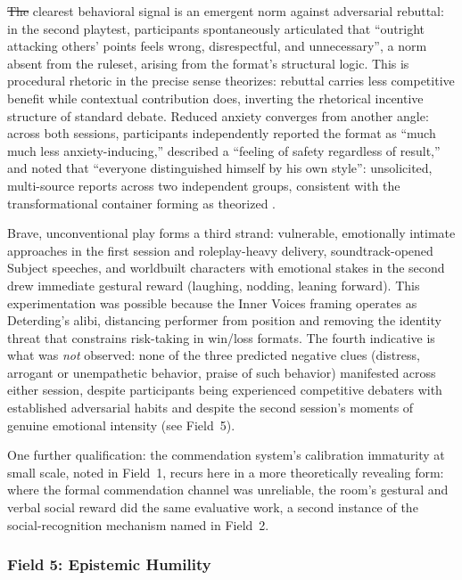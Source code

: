 \documentclass[12pt]{article}
\makeatletter
\providecommand{\DIFdeltex}[1]{{\protect\color{red}\sout{#1}}} %
\providecommand{\DIFdelend}{} %
\providecommand{\DIFdel}[1]{\texorpdfstring{\DIFdeltex{#1}}{}} %
\DeclareRobustCommand{\DIFdelend}{\DIFOaddend \let\includegraphics\DIFOincludegraphics} %
\let\sout@orig\sout %
\renewcommand{\sout}[1]{\ifmmode\text{\sout@orig{\ensuremath{#1}}}\else\sout@orig{#1}\fi} %
\makeatother
\begin{document}
\DIFdel{The }\DIFdelend clearest behavioral signal is an emergent norm against adversarial rebuttal: in the second playtest, participants spontaneously articulated that ``outright attacking others' points feels wrong, disrespectful, and unnecessary'', a norm absent from the ruleset, arising from the format's structural logic. This is procedural rhetoric in the precise sense \textcite{bogost2007persuasive} theorizes: rebuttal carries less competitive benefit while contextual contribution does, inverting the rhetorical incentive structure of standard debate. Reduced anxiety converges from another angle: across both sessions, participants independently reported the format as ``much much less anxiety-inducing,'' described a ``feeling of safety regardless of result,'' and noted that ``everyone distinguished himself by his own style'': unsolicited, multi-source reports across two independent groups, consistent with the transformational container forming as theorized \parencite{bowman2021magic, bowman2025transformative}.

Brave, unconventional play forms a third strand: vulnerable, emotionally intimate approaches in the first session and roleplay-heavy delivery, soundtrack-opened Subject speeches, and worldbuilt characters with emotional stakes in the second drew immediate gestural reward (laughing, nodding, leaning forward). This experimentation was possible because the Inner Voices framing operates as Deterding's \parencite{deterding2017alibis} alibi, distancing performer from position and removing the identity threat that constrains risk-taking in win/loss formats. The fourth indicative is what was \textit{not} observed: none of the three predicted negative clues (distress, arrogant or unempathetic behavior, praise of such behavior) manifested across either session, despite participants being experienced competitive debaters with established adversarial habits and despite the second session's moments of genuine emotional intensity (see Field~5).

One further qualification: the commendation system's calibration immaturity at small scale, noted in Field~1, recurs here in a more theoretically revealing form: where the formal commendation channel was unreliable, the room's gestural and verbal social reward did the same evaluative work, a second instance of the social-recognition mechanism named in Field~2.

\subsubsection{Field 5: Epistemic Humility}
\end{document}
